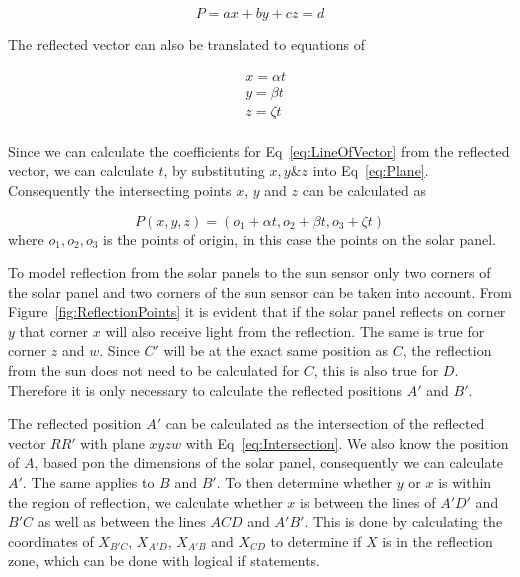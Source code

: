 \documentclass[letterpaper, 10 pt, conference]{ieeeconf}  %
\begin{document}
\begin{equation}
	P = ax + by + cz = d
	\label{eq:Plane}
\end{equation}

The reflected vector can also be translated to equations of 

\begin{equation}
	\begin{aligned}
	&	x = \alpha t \\
	&	y = \beta t \\
	&	z = \zeta t \\
	\end{aligned}
\label{eq:LineOfVector}
\end{equation}

Since we can calculate the coefficients for Eq~\ref{eq:LineOfVector} from the reflected vector, we can calculate $t$, by substituting $x, y \& z$ into Eq~\ref{eq:Plane}. Consequently the intersecting points $x$, $y$ and $z$ can be calculated as

\begin{equation}
	P(x, y, z) = (o_1 + \alpha t, o_2 + \beta t, o_3 + \zeta t)
	\label{eq:Intersection}
\end{equation}
where $o_1, o_2, o_3$ is the points of origin, in this case the points on the solar panel.


To model reflection from the solar panels to the sun sensor only two corners of the solar panel and two corners of the sun sensor can be taken into account. From Figure~\ref{fig:ReflectionPoints} it is evident that if the solar panel reflects on corner $y$ that corner $x$ will also receive light from the reflection. The same is true for corner $z$ and $w$. Since $C'$ will be at the exact same position as $C$, the reflection from the sun does not need to be calculated for $C$, this is also true for $D$. Therefore it is only necessary to calculate the reflected positions $A'$ and $B'$.

The reflected position $A'$ can be calculated as the intersection of the reflected vector $RR'$ with plane $xyzw$ with Eq~\ref{eq:Intersection}. We also know the position of $A$, based pon the dimensions of the solar panel, consequently we can calculate $A'$. The same applies to $B$ and $B'$. To then determine whether $y$ or $x$ is within the region of reflection, we calculate whether $x$ is between the lines of $A'D'$ and $B'C$ as well as between the lines $ACD$ and $A'B'$. This is done by calculating the coordinates of $X_{B'C}$, $X_{A'D}$, $X_{A'B}$ and $X_{CD}$ to determine if $X$ is in the reflection zone, which can be done with logical if statements.
\end{document}
